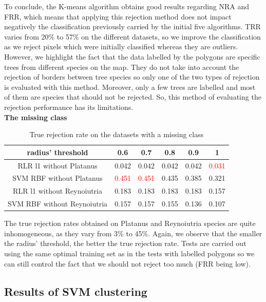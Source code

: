 \documentclass{siamart171218}
\begin{document}
To conclude, the K-means algorithm obtains good results regarding NRA and FRR, which means that applying this rejection method does not impact negatively the classification previously carried by the initial five algorithms. TRR varies from 20\% to 57\% on the different datasets, so we improve the classification as we reject pixels which were initially classified whereas they are outliers. 
However, we highlight the fact that the data labelled by the polygons are specific trees from different species on the map. They do not take into account the rejection of borders between tree species so only one of the two types of rejection is evaluated with this method. Moreover, only a few trees are labelled and most of them are species that should not be rejected. So, this method of evaluating the rejection performance has its limitations.\\

\textbf{The missing class}
\begin{table}[h!]
\centering
\caption{True rejection rate on the datasets with a missing class} 
\begin{tabular}{|c ||c c c c c|} 
 \hline
  radius' threshold  & 0.6 & 0.7 & 0.8 & 0.9 & 1 \\
 \hline\hline
 RLR l1 without Platanus & 0.042 & 0.042 & 0.042 & 0.042 & \textcolor{red}{0.031} \\
 \hline
 SVM RBF without Platanus &\textcolor{red}{0.451} & \textcolor{red}{0.451} & 0.435 & 0.385 & 0.321 \\
 \hline
 RLR l1 without Reynoiutria & 0.183 & 0.183 & 0.183 & 0.183 & 0.157 \\
 \hline
 SVM RBF without Reynoiutria & 0.157 & 0.157 & 0.155 & 0.136 & 0.107 \\
 \hline 
\end{tabular}

\label{confusion_table_rlr1}
\end{table}

The true rejection rates obtained on Platanus and Reynoiutria species are quite inhomogeneous, as they vary from 3\% to 45\%. Again, we observe that the smaller the radius' threshold, the better the true rejection rate. Tests are carried out using the same optimal training set as in the tests with labelled polygons so we can still control the fact that we should not reject too much (FRR being low). 

\subsection{Results of SVM clustering}\\
\end{document}
